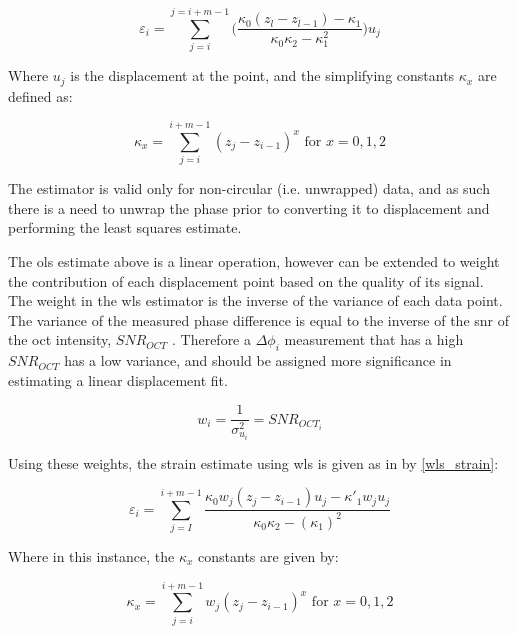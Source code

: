 \begin{equation}
	\label{ols_strain}
	\varepsilon_i = \sum\limits_{j=i}^{j=i+m-1} \bigg(\frac{\kappa_0 (z_l-z_{l-1})-\kappa_1}{\kappa_0 \kappa_2 - \kappa_1^2} \bigg) u_j
\end{equation}

Where $u_j$ is the displacement at the point, and the simplifying constants $\kappa_x$ are defined as:

\begin{equation}
	\label{ols_k}
	\kappa_x = \sum \limits_{j=i}^{i+m-1} (z_j - z_{i-1})^x \text{   for   } x = 0,1,2
\end{equation}

The estimator is valid only for non-circular (i.e. unwrapped) data, and as such there is a need to unwrap the phase prior to converting it to displacement and performing the least squares estimate.

The \ac{ols} estimate above is a linear operation, however can be extended to weight the contribution of each displacement point based on the quality of its signal. 
The weight in the \ac{wls} estimator is the inverse of the variance of each data point.
The variance of the measured phase difference is equal to the inverse of the \ac{snr} of the \ac{oct} intensity, $SNR_{OCT}$ \cite{goodman_statistical_2015}. Therefore a $\Delta \phi_i$ measurement that has a high $SNR_{OCT}$ has a low variance, and should be assigned more significance in estimating a linear displacement fit. 

\begin{equation}
	\label{wls_w}
	w_i = \frac{1}{\sigma_{u_i}^2} = SNR_{OCT_i}
\end{equation}

Using these weights, the strain estimate using \ac{wls} is given as in \cite{kennedy_strain_2012} by \autoref{wls_strain}:

\begin{equation}
	\label{wls_strain}
	\varepsilon_i = \sum \limits_{j=I}^{i+m-1} \frac{\kappa_0 w_j (z_j - z_{i-1}) u_j - \kappa'_1 w_	j u_j}{\kappa_0 \kappa_2 - (\kappa_1)^2}
\end{equation}

Where in this instance, the $\kappa_x$ constants are given by:

\begin{equation}
	\label{wls_k}
	\kappa_x = \sum \limits_{j=i}^{i+m-1} w_j (z_j - z_{i-1})^x \text{   for   } x=0,1,2
\end{equation}

